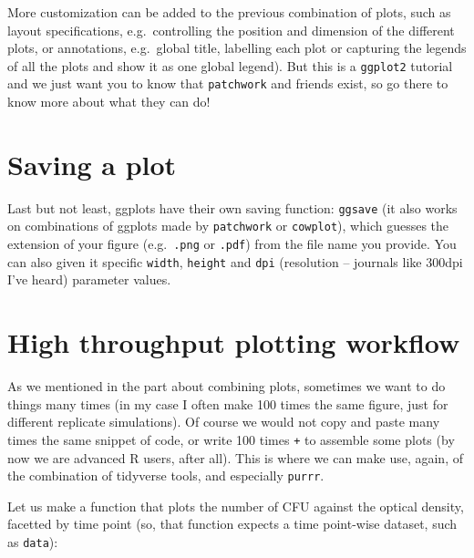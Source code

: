 \documentclass[]{book}
\begin{document}
More customization can be added to the previous combination of plots, such as layout specifications, e.g.~controlling the position and dimension of the different plots, or annotations, e.g.~global title, labelling each plot or capturing the legends of all the plots and show it as one global legend). But this is a \texttt{ggplot2} tutorial and we just want you to know that \texttt{patchwork} and friends exist, so go there to know more about what they can do!

\hypertarget{saving-a-plot}{%
\section{Saving a plot}\label{saving-a-plot}}

Last but not least, ggplots have their own saving function: \texttt{ggsave} (it also works on combinations of ggplots made by \texttt{patchwork} or \texttt{cowplot}), which guesses the extension of your figure (e.g.~\texttt{.png} or \texttt{.pdf}) from the file name you provide. You can also given it specific \texttt{width}, \texttt{height} and \texttt{dpi} (resolution -- journals like 300dpi I've heard) parameter values.

\hypertarget{high-throughput-plotting-workflow}{%
\section{High throughput plotting workflow}\label{high-throughput-plotting-workflow}}

As we mentioned in the part about combining plots, sometimes we want to do things many times (in my case I often make 100 times the same figure, just for different replicate simulations). Of course we would not copy and paste many times the same snippet of code, or write 100 times \texttt{+} to assemble some plots (by now we are advanced R users, after all). This is where we can make use, again, of the combination of tidyverse tools, and especially \texttt{purrr}.

Let us make a function that plots the number of CFU against the optical density, facetted by time point (so, that function expects a time point-wise dataset, such as \texttt{data}):
\end{document}
